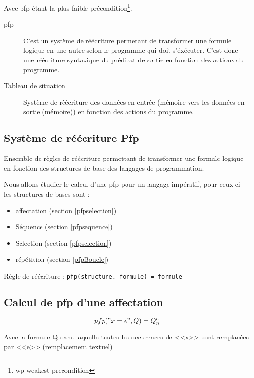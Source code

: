 	Avec pfp étant la plus faible précondition\footnote{wp weakest precondition}.
	\begin{description}
		\item[pfp]	C'est un système de réécriture permetant de transformer une formule logique en une autre selon le programme qui doit s'éxécuter.
			C'est donc une réécriture syntaxique du prédicat de sortie en fonction des actions du programme.  \item[Tableau de situation] Système de réécriture des données en entrée (mémoire vers les données en sortie (mémoire)) en fonction des actions du programme.  \end{description}
	\subsection{Système de réécriture Pfp}
		Ensemble de règles de réécriture permettant de transformer une formule logique en fonction des structures de base des langages de programmation.

		Nous allons étudier le calcul d'une pfp pour un langage impératif, pour ceux-ci les structures de bases sont :
			\begin{itemize}
				\item affectation (section \ref{pfpselection})
				\item Séquence (section \ref{pfpsequence})
				\item Sélection (section \ref{pfpselection})
				\item répétition (section \ref{pfpBoucle})
			\end{itemize}

		Règle de réécriture : \texttt{pfp(structure, formule) = formule}

		\subsection{Calcul de pfp d'une affectation}\label{pfpaffectation}
	$$pfp("x=e", Q) = Q^e_n$$

	Avec la formule Q dans laquelle toutes les occurences de <<x>> sont remplacées par <<e>> (remplacement textuel)
